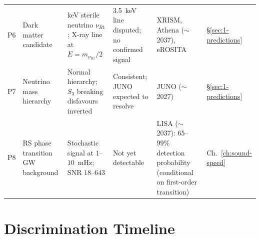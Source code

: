 \begin{table}[h!]
\begin{tabular}{@{}p{0.6cm}p{3.5cm}p{3.4cm}p{3.4cm}p{2.8cm}p{1.8cm}@{}}
P6 &
Dark matter candidate &
keV sterile neutrino $\nu_{R1}$; X-ray line at $E = m_{\nu_{R1}}/2$ &
3.5~keV line disputed; no confirmed signal &
XRISM, Athena ($\sim$2037), eROSITA &
\S\ref{sec:1-predictions} \\

P7 &
Neutrino mass hierarchy &
Normal hierarchy; $S_3$ breaking disfavours inverted &
Consistent; JUNO expected to resolve &
JUNO ($\sim$2027) &
\S\ref{sec:1-predictions} \\

P8 &
RS phase transition GW background &
Stochastic signal at $1$--$10$~mHz; SNR $18$--$643$ &
Not yet detectable &
LISA ($\sim$2037): $65$--$99\%$ detection probability (conditional on first-order transition) &
Ch.~\ref{ch:sound-speed} \\

\bottomrule
\end{tabular}
\end{table}

\section{Discrimination Timeline}
\label{app:pred-timeline}

